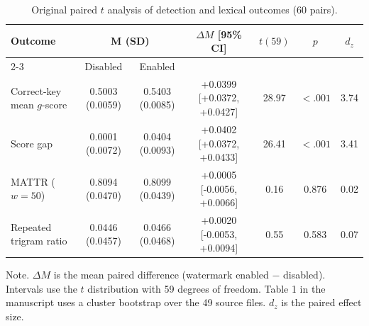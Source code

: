 \begin{table}[t]
\centering
\caption{Original paired $t$ analysis of detection and lexical outcomes (60 pairs).}
\label{tab:all_outcomes}
\begin{tabular}{lcccccc}
\toprule
Outcome & \multicolumn{2}{c}{M (SD)} & \multicolumn{1}{c}{$\Delta M$ [95\% CI]} & $t(59)$ & $p$ & $d_z$ \\
\cmidrule(lr){2-3}
 & Disabled & Enabled & & & & \\
\midrule
Correct-key mean $g$-score & 0.5003 (0.0059) & 0.5403 (0.0085) & +0.0399 [+0.0372, +0.0427] & 28.97 & $<.001$ & 3.74 \\
Score gap & 0.0001 (0.0072) & 0.0404 (0.0093) & +0.0402 [+0.0372, +0.0433] & 26.41 & $<.001$ & 3.41 \\
MATTR ($w{=}50$) & 0.8094 (0.0470) & 0.8099 (0.0439) & +0.0005 [-0.0056, +0.0066] & 0.16 & 0.876 & 0.02 \\
Repeated trigram ratio & 0.0446 (0.0457) & 0.0466 (0.0468) & +0.0020 [-0.0053, +0.0094] & 0.55 & 0.583 & 0.07 \\
\bottomrule
\end{tabular}
\begin{flushleft}\footnotesize
Note. $\Delta M$ is the mean paired difference (watermark enabled $-$ disabled).
Intervals use the $t$ distribution with 59 degrees of freedom. Table 1 in the manuscript uses
a cluster bootstrap over the 49 source files. $d_z$ is the paired effect size.
\end{flushleft}
\end{table}